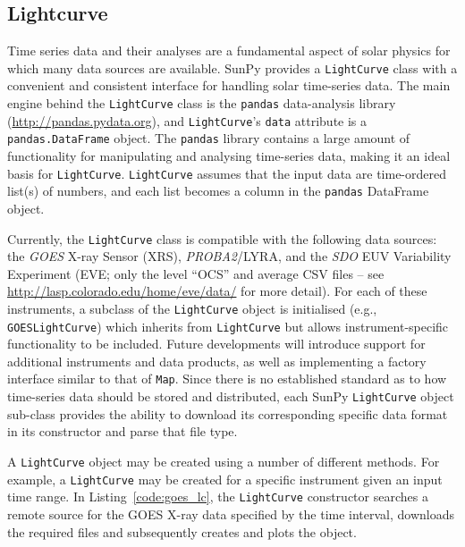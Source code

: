 \subsection{Lightcurve}\label{ssec:lightcurve}

Time series data and their analyses are a fundamental aspect of solar
physics for which many data sources are available.
SunPy provides a \texttt{LightCurve} class
with a convenient and consistent interface for handling solar time-series
data.  The main engine behind the \texttt{LightCurve} class is
the {\texttt{pandas}} data-analysis library (\href{http://pandas.pydata.org}{http://pandas.pydata.org}), and 
\texttt{LightCurve}'s \texttt{data} attribute is a \texttt{pandas.DataFrame} 
object.
The \texttt{pandas} library contains a large amount
of functionality for manipulating and analysing time-series data,
making it an ideal basis for \texttt{LightCurve}.  \texttt{LightCurve}
assumes that the input data are time-ordered list(s) of numbers, and each
list becomes a column in the \texttt{pandas} DataFrame object.

Currently, the \texttt{LightCurve} class is compatible with the
following data sources: the \textit{GOES} X-ray Sensor (XRS), \textit{PROBA2}/LYRA, and
the \textit{SDO} EUV Variability Experiment (EVE; only the level ``OCS'' and
average CSV files -- see \url{http://lasp.colorado.edu/home/eve/data/}
for more detail).  For each of these instruments, a subclass of the
\texttt{LightCurve} object is initialised
(e.g., \texttt{GOESLightCurve}) which inherits from
\texttt{LightCurve} but allows instrument-specific functionality to be
included.  Future developments will introduce support for additional
instruments and data products, as well as implementing a factory interface 
similar to that of \texttt{Map}.  Since there is no established standard
as to how time-series data should be stored and distributed, each SunPy 
\texttt{LightCurve} object sub-class provides the ability to download its corresponding 
specific data format in its constructor and parse that file type.

A \texttt{LightCurve} object may be created using a number of different methods. 
For example, a \texttt{LightCurve} may be created for a specific instrument given
an input time range. In Listing~\ref{code:goes_lc}, 
the \texttt{LightCurve} constructor searches a remote source for the GOES X-ray 
data specified by the time interval, downloads the required files and 
subsequently creates and plots the object.

